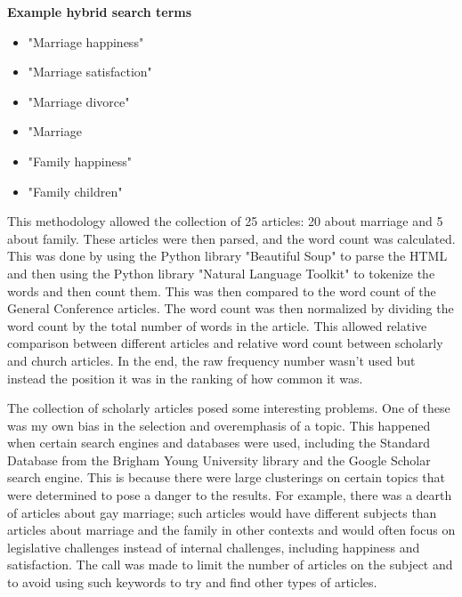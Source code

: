 \documentclass[twocolumn]{article}
\begin{document}
\begin{center}
    \parbox{\linewidth}{\centering\textbf{Example hybrid search terms}}
\end{center}

\begin{itemize}
    \item "Marriage happiness"
    \item "Marriage satisfaction"
    \item "Marriage divorce"
    \item "Marriage
    \item "Family happiness"
    \item "Family children"
\end{itemize}

This methodology allowed the collection of 25 articles: 20 about marriage and 5 about family. These articles were then parsed, and the word count was calculated. This was done by using the Python library "Beautiful Soup" to parse the HTML and then using the Python library "Natural Language Toolkit" to tokenize the words and then count them. This was then compared to the word count of the General Conference articles. The word count was then normalized by dividing the word count by the total number of words in the article. This allowed relative comparison between different articles and relative word count between scholarly and church articles. In the end, the raw frequency number wasn’t used but instead the position it was in the ranking of how common it was.

The collection of scholarly articles posed some interesting problems. One of these was my own bias in the selection and overemphasis of a topic. This happened when certain search engines and databases were used, including the Standard Database from the Brigham Young University library and the Google Scholar search engine. This is because there were large clusterings on certain topics that were determined to pose a danger to the results. For example, there was a dearth of articles about gay marriage; such articles would have different subjects than articles about marriage and the family in other contexts and would often focus on legislative challenges instead of internal challenges, including happiness and satisfaction. The call was made to limit the number of articles on the subject and to avoid using such keywords to try and find other types of articles.
\end{document}
